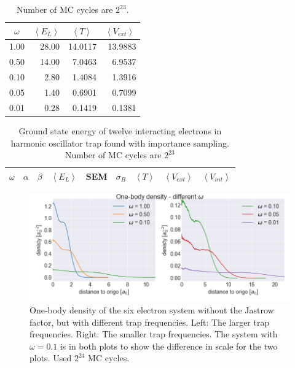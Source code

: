 \begin{table}[H]\caption{Number of MC cycles are $2^{23}$. }\label{tab:ground_state_energy_importance_12p}
\center
\begin{tabular}{c|rrr}
$\omega$ & $\left< E_L \right>$  & $\left< T \right>\,\,\,$  & $\left< V_{ext}\right>\,$ \\ \hline
1.00 & 28.00 & 14.0117 & 13.9883\\ 
0.50 & 14.00 & 7.0463 & 6.9537\\ 
0.10 & 2.80 & 1.4084 & 1.3916\\ 
0.05 & 1.40 & 0.6901 & 0.7099\\ 
0.01 & 0.28 & 0.1419 & 0.1381\\ 
\end{tabular}
\end{table}

\begin{table}[H]\caption{Ground state energy of twelve interacting electrons in harmonic oscillator trap found with importance sampling. Number of MC cycles are $2^{23}$}\label{tab:ground_state_energy_importance_interaction_12p}
\center
\begin{tabular}{c|cccccccc}
$\omega$ & $\alpha$ & $\beta$ & $\left< E_L \right>$ & SEM & $\sigma_B$ &  $\left< T \right>$  & $\left< V_{ext}\right>$ & $\left<V_{int} \right>$  \\ \hline
\end{tabular}
\end{table}


\begin{figure}[H]
\center
\includegraphics[width=0.85\linewidth]{../Results/one_body_density_no_interaction_12p}\caption{One-body density of the six electron system without the Jastrow factor, but with different trap frequencies. Left: The larger trap frequencies. Right: The smaller trap frequencies. The system with $\omega = 0.1$ is in both plots to show the difference in scale for the two plots. Used $2^{24}$ MC cycles. }\label{fig:one_body_density_no_interaction_12p}
\end{figure}

